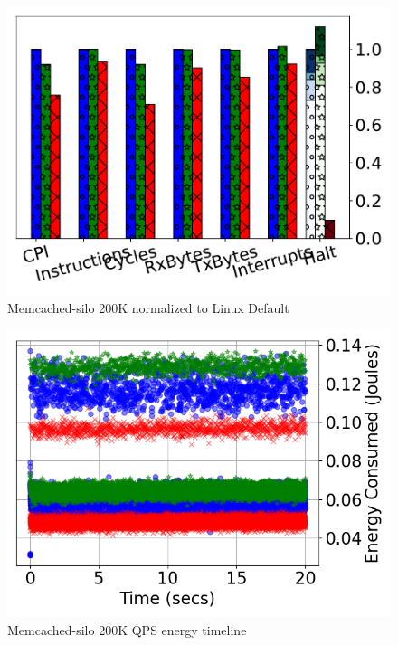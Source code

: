 \begin{figure}
  \includegraphics[width=\columnwidth]{osdi_figures/mcdsilo_200000_barplot.pdf}
  \caption{Memcached-silo 200K normalized to Linux Default}
  \label{fig:mcdsilo200000_barplot}
\end{figure}

\begin{figure}
  \includegraphics[width=\columnwidth]{osdi_figures/mcdsilo_200000_joules_timeline.png}
  \caption{Memcached-silo 200K QPS energy timeline}
  \label{fig:mcdsilo200000_joule_timeline}
\end{figure}

